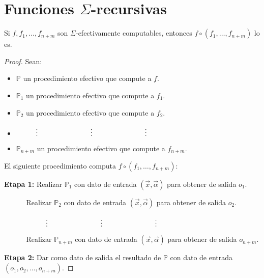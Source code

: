 \section{Funciones $\Sigma$-recursivas}

  \begin{lemma}
    \PN Si $f, f_{1}, \dotsc, f_{n+m}$ son $\Sigma$-efectivamente computables, entonces $f \circ (f_{1}, \dotsc,
    f_{n+m})$ lo es.
  \end{lemma}
  \begin{proof}
    \PN Sean:

    \begin{itemize}
      \item $\mathbb{P}$ un procedimiento efectivo que compute a $f$.
      \item $\mathbb{P}_{1}$ un procedimiento efectivo que compute a $f_{1}$.
      \item $\mathbb{P}_{2}$ un procedimiento efectivo que compute a $f_{2}$.
      \item $\vdotswithin{(n-1)m+1} \qquad \vdotswithin{(n-1)m+2} \qquad \vdotswithin{(n-1)m+r}$
      \item $\mathbb{P}_{n+m}$ un procedimiento efectivo que compute a $f_{n+m}$.
    \end{itemize}

    \PN El siguiente procedimiento computa $f \circ (f_{1}, \dotsc, f_{n+m})$:

    \vspace{3mm}
    \PN \textbf{Etapa 1:}
    Realizar $\mathbb{P}_{1}$ con dato de entrada $(\vec{x}, \vec{\alpha})$ para obtener de salida $o_{1}$.

    $\qquad\;\;\;\;$Realizar $\mathbb{P}_{2}$ con dato de entrada $(\vec{x}, \vec{\alpha})$ para obtener de salida
    $o_{2}$.

    $\qquad\;\;\;\;\vdotswithin{(n-1)m+1} \qquad \vdotswithin{(n-1)m+2} \qquad \vdotswithin{(n-1)m+r}$

    $\qquad\;\;\;\;$Realizar $\mathbb{P}_{n+m}$ con dato de entrada $(\vec{x}, \vec{\alpha})$ para obtener de salida
    $o_{n+m}$.

    \PN \textbf{Etapa 2:}
    Dar como dato de salida el resultado de $\mathbb{P}$ con dato de entrada $(o_{1}, o_{2}, \dotsc, o_{n+m})$.
  \end{proof}

